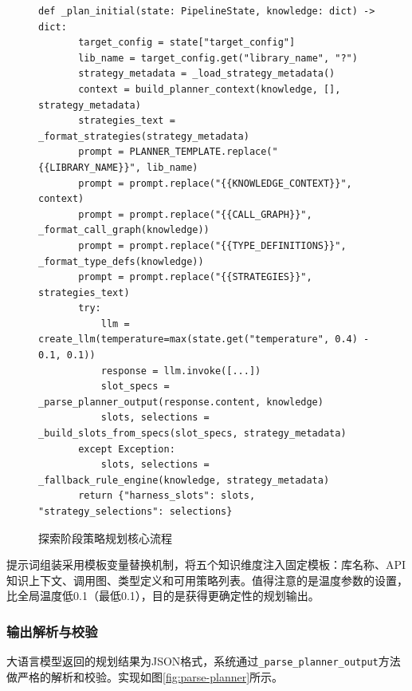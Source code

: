 \begin{figure}[H]
    \centering
    \begin{lstlisting}[style=style@python]
   def _plan_initial(state: PipelineState, knowledge: dict) -> dict:
       target_config = state["target_config"]
       lib_name = target_config.get("library_name", "?")
       strategy_metadata = _load_strategy_metadata()
       context = build_planner_context(knowledge, [], strategy_metadata)
       strategies_text = _format_strategies(strategy_metadata)
       prompt = PLANNER_TEMPLATE.replace("{{LIBRARY_NAME}}", lib_name)
       prompt = prompt.replace("{{KNOWLEDGE_CONTEXT}}", context)
       prompt = prompt.replace("{{CALL_GRAPH}}", _format_call_graph(knowledge))
       prompt = prompt.replace("{{TYPE_DEFINITIONS}}", _format_type_defs(knowledge))
       prompt = prompt.replace("{{STRATEGIES}}", strategies_text)
       try:
           llm = create_llm(temperature=max(state.get("temperature", 0.4) - 0.1, 0.1))
           response = llm.invoke([...])
           slot_specs = _parse_planner_output(response.content, knowledge)
           slots, selections = _build_slots_from_specs(slot_specs, strategy_metadata)
       except Exception:
           slots, selections = _fallback_rule_engine(knowledge, strategy_metadata)
       return {"harness_slots": slots, "strategy_selections": selections}
    \end{lstlisting}
    \caption{探索阶段策略规划核心流程}
    \label{fig:plan-initial}
\end{figure}

提示词组装采用模板变量替换机制，将五个知识维度注入固定模板：库名称、API知识上下文、调用图、类型定义和可用策略列表。值得注意的是温度参数的设置，比全局温度低0.1（最低0.1），目的是获得更确定性的规划输出。

\subsubsection{输出解析与校验}

大语言模型返回的规划结果为JSON格式，系统通过\texttt{\_parse\_planner\_output}方法做严格的解析和校验。实现如图\ref{fig:parse-planner}所示。

